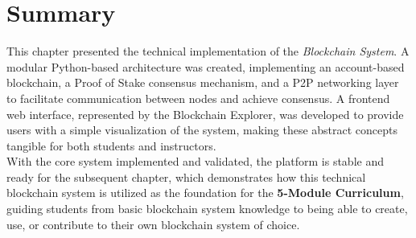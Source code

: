 \section{Summary}
This chapter presented the technical implementation of the \textit{Blockchain System}. A modular Python-based architecture was created, implementing an account-based blockchain, a Proof of Stake consensus mechanism, and a P2P networking layer to facilitate communication between nodes and achieve consensus. A frontend web interface, represented by the Blockchain Explorer, was developed to provide users with a simple visualization of the system, making these abstract concepts tangible for both students and instructors.\\With the core system implemented and validated, the platform is stable and ready for the subsequent chapter, which demonstrates how this technical blockchain system is utilized as the foundation for the \textbf{5-Module Curriculum}, guiding students from basic blockchain system knowledge to being able to create, use, or contribute to their own blockchain system of choice.
